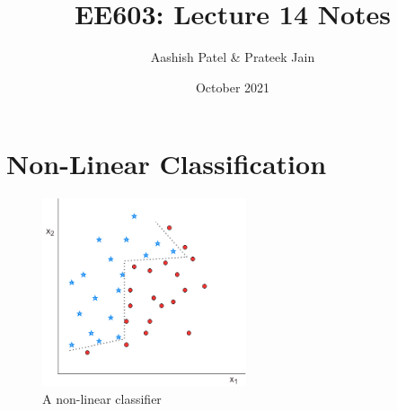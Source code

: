 \documentclass[11pt]{article}
\title{EE603: Lecture 14 Notes}
\author{Aashish Patel \& Prateek Jain }
\date{October 2021}
\begin{document}
\maketitle

\section{Non-Linear Classification}
\begin{figure}[htp]
    \centering
    \includegraphics[width=6cm]{fig1.png}
    \caption{A non-linear classifier}
    \label{fig:intro}
\end{figure}
\end{document}
